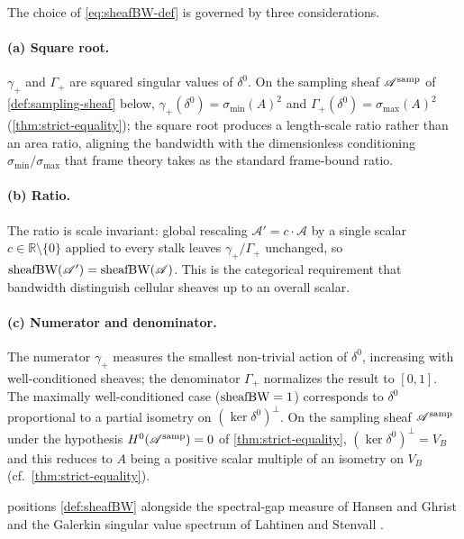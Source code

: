 The choice of \cref{eq:sheafBW-def} is governed by three
considerations.

\paragraph{(a) Square root.}
$\gamma_+$ and $\Gamma_+$ are squared singular values of
$\delta^0$. On the sampling sheaf $\mathscr{A}^{\mathrm{samp}}$ of
\cref{def:sampling-sheaf} below,
$\gamma_+(\delta^0) = \sigma_{\min}(A)^2$ and
$\Gamma_+(\delta^0) = \sigma_{\max}(A)^2$
(\cref{thm:strict-equality}); the square root produces a
length-scale ratio rather than an area ratio, aligning the bandwidth
with the dimensionless conditioning $\sigma_{\min}/\sigma_{\max}$
that frame theory takes as the standard frame-bound ratio.

\paragraph{(b) Ratio.}
The ratio is scale invariant: global rescaling
$\mathscr{A}' = c \cdot \mathscr{A}$ by a single scalar
$c \in \mathbb{R} \setminus \{0\}$ applied to every stalk leaves
$\gamma_+ / \Gamma_+$ unchanged, so
$\operatorname{sheafBW}(\mathscr{A}') = \operatorname{sheafBW}(\mathscr{A})$. This is the
categorical requirement that bandwidth distinguish cellular sheaves
up to an overall scalar.

\paragraph{(c) Numerator and denominator.}
The numerator $\gamma_+$ measures the smallest non-trivial action
of $\delta^0$, increasing with well-conditioned sheaves; the
denominator $\Gamma_+$ normalizes the result to $[0, 1]$. The
maximally well-conditioned case ($\operatorname{sheafBW} = 1$) corresponds to
$\delta^0$ proportional to a partial isometry on
$(\ker \delta^0)^\perp$. On the sampling sheaf $\mathscr{A}^{\mathrm{samp}}$ under
the hypothesis $H^0(\mathscr{A}^{\mathrm{samp}}) = 0$ of \cref{thm:strict-equality},
$(\ker \delta^0)^\perp = V_B$ and this reduces to $A$ being a
positive scalar multiple of an isometry on $V_B$
(cf.\ \cref{thm:strict-equality}).

 positions \cref{def:sheafBW} alongside
the spectral-gap measure of Hansen and Ghrist
\cite{HansenGhrist2019} and the Galerkin singular value spectrum of
Lahtinen and Stenvall \cite{LahtinenStenvall2020}.

